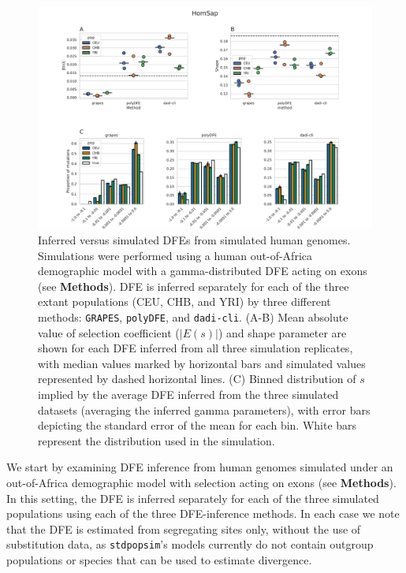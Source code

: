 \documentclass[hidelinks]{article}
\newcommand{\stdpopsim}{\texttt{stdpopsim}\xspace}
\newcommand{\polydfe}{\texttt{polyDFE}\xspace}
\newcommand{\dadicli}{\texttt{dadi-cli}\xspace}
\newcommand{\grapes}{\texttt{GRAPES}\xspace}
\begin{document}
    \begin{figure}[b!]
        \centering
        \includegraphics[width=\linewidth]{figures/HomSap/OOA/HomSap_discrete_DFE}
        \caption{Inferred versus simulated DFEs from simulated human genomes.
        Simulations were performed using a human out-of-Africa demographic model with a gamma-distributed DFE
        acting on exons (see \textbf{Methods}).
        DFE is inferred separately for each of the three extant populations (CEU, CHB, and YRI)
        by three different methods: \grapes, \polydfe , and \dadicli.
        (A-B) Mean absolute value of selection coefficient ($\lvert E(s) \rvert $) and shape parameter are
        shown for each DFE inferred from all three simulation replicates,
        with median values marked by horizontal bars
        and simulated values represented by dashed horizontal lines.
        (C) Binned distribution of $s$ implied by the average DFE inferred from the three simulated datasets (averaging the inferred gamma parameters),
        with error bars depicting the standard error of the mean for each bin.
        White bars represent the distribution used in the simulation. 
        }
        \label{fig:homsap-dfe.ooa}
    \end{figure}



    We start by examining DFE inference from human genomes simulated under an out-of-Africa demographic model
    with selection acting on exons (see \textbf{Methods}).
    In this setting, the DFE is inferred separately for each of the three simulated populations
    using each of the three DFE-inference methods.
    In each case we note that the DFE is estimated from segregating sites only,
    without the use of substitution data, as \stdpopsim's models currently do not
    contain outgroup populations or species that can be used to estimate divergence.
\end{document}
